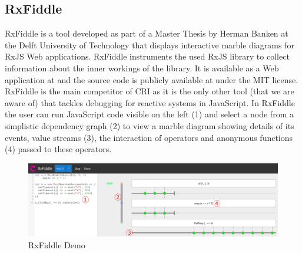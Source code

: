 	\subsection{RxFiddle}
	\label{sec:RxFiddle}
	RxFiddle \cite{RxFiddle} is a tool developed as part of a Master Thesis by Herman Banken at the Delft University of Technology that displays interactive marble diagrams for RxJS Web applications. RxFiddle instruments the used RxJS library to collect information about the inner workings of the library. It is available as a Web application at \cite{RxFiddle} and the source code is publicly available at \cite{RxFiddleGitHub} under the MIT license. RxFiddle is the main competitor of CRI as it is the only other tool (that we are aware of) that tackles debugging for reactive systems in JavaScript. In RxFiddle the user can run JavaScript code visible on the left (1) and select a node from a simplistic dependency graph (2) to view a marble diagram showing details of its events, value streams (3), the interaction of operators and anonymous functions (4) passed to these operators.
	
	\begin{figure}[!h]
		\centering
		\includegraphics[scale=0.5,trim=0 0 0 0]{gfx/RxFiddleDemo.png}
		\caption{RxFiddle Demo \protect\cite{RxFiddle}}
		\label{fig:RxFiddleDemo}
	\end{figure}

